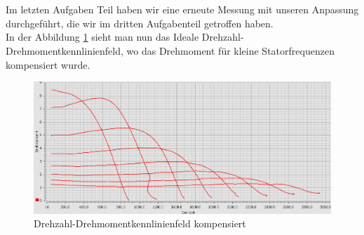 \section{}
Im letzten Aufgaben Teil haben wir eine erneute Messung mit unseren Anpassung durchgeführt, die wir im dritten Aufgabenteil getroffen haben.\\
In der Abbildung \ref{fig:7d} sieht man nun das Ideale Drehzahl-Drehmomentkennlinienfeld, wo das Drehmoment für kleine Statorfrequenzen kompensiert wurde.
\begin{figure}[h]
	\centering
	\includegraphics[width=\textwidth]{./Bilder/ele2.png}
	\caption{Drehzahl-Drehmomentkennlinienfeld kompensiert}
	\label{fig:7d}
\end{figure}
